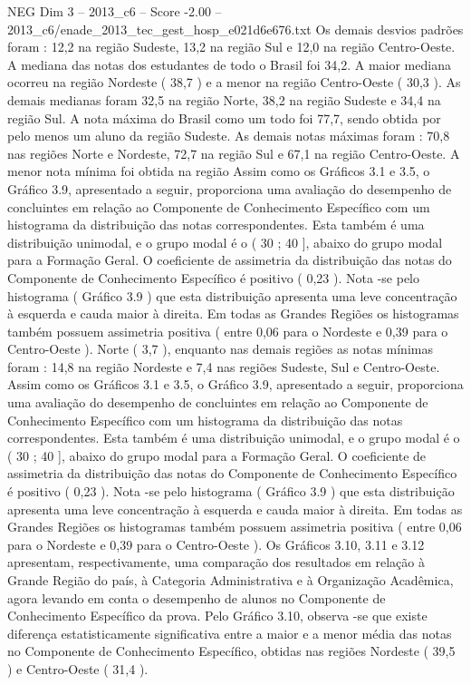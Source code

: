 \begin{textsample}{NEG Dim 3 – 2013\_c6 – Score -2.00 – 2013\_c6/enade\_2013\_tec\_gest\_hosp\_e021d6e676.txt}
Os demais desvios padrões foram : 12,2 na região Sudeste, 13,2 na região Sul e 12,0 na região Centro-Oeste.
A mediana das notas dos estudantes de todo o Brasil foi 34,2.
A maior mediana ocorreu na região Nordeste ( 38,7 ) e a menor na região Centro-Oeste ( 30,3 ).
As demais medianas foram 32,5 na região Norte, 38,2 na região Sudeste e 34,4 na região Sul.
A nota máxima do Brasil como um todo foi 77,7, sendo obtida por pelo menos um aluno da região Sudeste.
As demais notas máximas foram : 70,8 nas regiões Norte e Nordeste, 72,7 na região Sul e 67,1 na região Centro-Oeste.
A menor nota mínima foi obtida na região Assim como os Gráficos 3.1 e 3.5, o Gráfico 3.9, apresentado a seguir, proporciona uma avaliação do desempenho de concluintes em relação ao Componente de Conhecimento Específico com um histograma da distribuição das notas correspondentes.
Esta também é uma distribuição unimodal, e o grupo modal é o ( 30 ; 40 ], abaixo do grupo modal para a Formação Geral.
O coeficiente de assimetria da distribuição das notas do Componente de Conhecimento Específico é positivo ( 0,23 ).
Nota -se pelo histograma ( Gráfico 3.9 ) que esta distribuição apresenta uma leve concentração à esquerda e cauda maior à direita.
Em todas as Grandes Regiões os histogramas também possuem assimetria positiva ( entre 0,06 para o Nordeste e 0,39 para o Centro-Oeste ).
Norte ( 3,7 ), enquanto nas demais regiões as notas mínimas foram : 14,8 na região Nordeste e 7,4 nas regiões Sudeste, Sul e Centro-Oeste.
Assim como os Gráficos 3.1 e 3.5, o Gráfico 3.9, apresentado a seguir, proporciona uma avaliação do desempenho de concluintes em relação ao Componente de Conhecimento Específico com um histograma da distribuição das notas correspondentes.
Esta também é uma distribuição unimodal, e o grupo modal é o ( 30 ; 40 ], abaixo do grupo modal para a Formação Geral.
O coeficiente de assimetria da distribuição das notas do Componente de Conhecimento Específico é positivo ( 0,23 ).
Nota -se pelo histograma ( Gráfico 3.9 ) que esta distribuição apresenta uma leve concentração à esquerda e cauda maior à direita.
Em todas as Grandes Regiões os histogramas também possuem assimetria positiva ( entre 0,06 para o Nordeste e 0,39 para o Centro-Oeste ).
Os Gráficos 3.10, 3.11 e 3.12 apresentam, respectivamente, uma comparação dos resultados em relação à Grande Região do país, à Categoria Administrativa e à Organização Acadêmica, agora levando em conta o desempenho de alunos no Componente de Conhecimento Específico da prova.
Pelo Gráfico 3.10, observa -se que existe diferença estatisticamente significativa entre a maior e a menor média das notas no Componente de Conhecimento Específico, obtidas nas regiões Nordeste ( 39,5 ) e Centro-Oeste ( 31,4 ).

\end{textsample}
